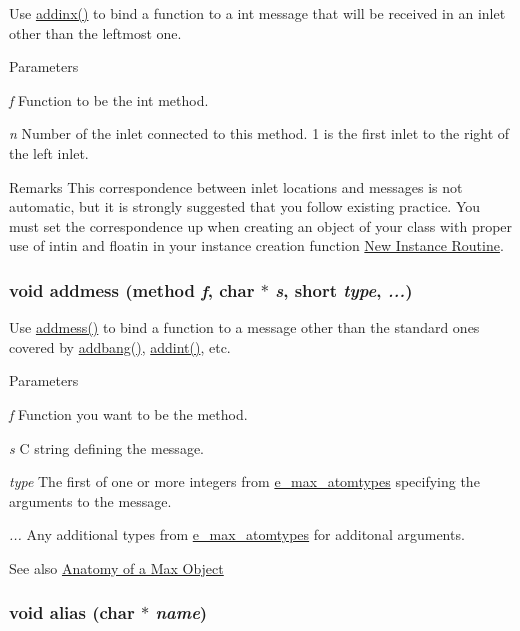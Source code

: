 Use \hyperlink{group__class__old_gad3a69b2d38b257464c6a0f8a50efd85a}{addinx()} to bind a function to a int message that will be received in an inlet other than the leftmost one. 
\begin{DoxyParams}{Parameters}
\item[{\em f}]Function to be the int method. \item[{\em n}]Number of the inlet connected to this method. 1 is the first inlet to the right of the left inlet.\end{DoxyParams}
\begin{DoxyRemark}{Remarks}
This correspondence between inlet locations and messages is not automatic, but it is strongly suggested that you follow existing practice. You must set the correspondence up when creating an object of your class with proper use of intin and floatin in your instance creation function \hyperlink{chapter_anatomy_chapter_anatomy_object_new}{New Instance Routine}. 
\end{DoxyRemark}
\hypertarget{group__class__old_ga0d9bfa416fdd861d1b2fd2d17701cbb3}{
\subsubsection[{addmess}]{\setlength{\rightskip}{0pt plus 5cm}void addmess ({\bf method} {\em f}, \/  char $\ast$ {\em s}, \/  short {\em type}, \/   {\em ...})}}
\label{group__class__old_ga0d9bfa416fdd861d1b2fd2d17701cbb3}


Use \hyperlink{group__class__old_ga0d9bfa416fdd861d1b2fd2d17701cbb3}{addmess()} to bind a function to a message other than the standard ones covered by \hyperlink{group__class__old_gac667faa21ecad5184005266844ed0b48}{addbang()}, \hyperlink{group__class__old_ga85afc0cd451465117ac80593d3deb4f9}{addint()}, etc. 
\begin{DoxyParams}{Parameters}
\item[{\em f}]Function you want to be the method. \item[{\em s}]C string defining the message. \item[{\em type}]The first of one or more integers from \hyperlink{group__atom_ga8aa6700e9f00b132eb376db6e39ade47}{e\_\-max\_\-atomtypes} specifying the arguments to the message. \item[{\em ...}]Any additional types from \hyperlink{group__atom_ga8aa6700e9f00b132eb376db6e39ade47}{e\_\-max\_\-atomtypes} for additonal arguments. \end{DoxyParams}
\begin{DoxySeeAlso}{See also}
\hyperlink{chapter_anatomy}{Anatomy of a Max Object} 
\end{DoxySeeAlso}
\hypertarget{group__class__old_gad8f119f6232340c85b3bb358227576b3}{
\subsubsection[{alias}]{\setlength{\rightskip}{0pt plus 5cm}void alias (char $\ast$ {\em name})}}
\label{group__class__old_gad8f119f6232340c85b3bb358227576b3}



